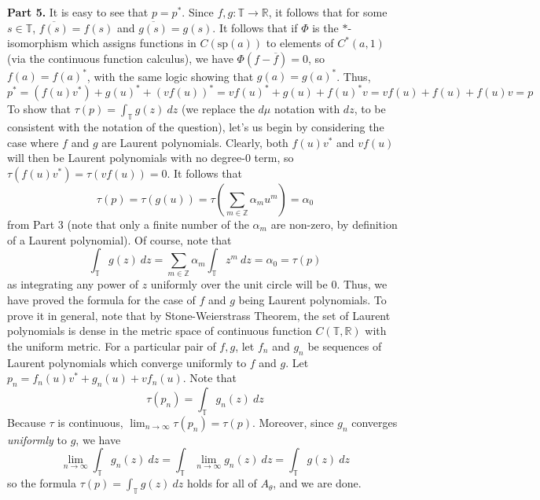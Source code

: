 \documentclass[aps,pra,showpacs,notitlepage,onecolumn,superscriptaddress,nofootinbib]{revtex4-1}
\theoremstyle{definition}
\begin{document}
    \noindent \textbf{Part 5.} It is easy to see that $p = p^{*}$. Since $f, g : \mathbb{T} \rightarrow \mathbb{R}$, it follows that for some $s \in \mathbb{T}$, $\overline{f(s)} = f(s)$ and $\overline{g(s)} = g(s)$.
    It follows that if $\Phi$ is the $*$-isomorphism which assigns functions in $C(\text{sp}(a))$ to elements of $C^{*}(a, 1)$ (via the continuous function calculus), we have $\Phi(f - \overline{f}) = 0$, so $f(a) = f(a)^{*}$, with the same logic showing that $g(a) = g(a)^{*}$.
    Thus,
    \begin{equation}
      p^{*} = (f(u) v^{*}) + g(u)^{*} + (v f(u))^{*} = v f(u)^{*} + g(u) + f(u)^{*} v = v f(u) + f(u) + f(u) v = p
    \end{equation}
    To show that $\tau(p) = \int_{\mathbb{T}} g(z) \ dz$ (we replace the $d\mu$ notation with $dz$, to be consistent with the notation of the question), let's us begin by considering the case where
    $f$ and $g$ are Laurent polynomials. Clearly, both $f(u) v^{*}$ and $v f(u)$ will then be Laurent polynomials with no degree-$0$ term, so $\tau(f(u) v^{*}) = \tau(v f(u)) = 0$. It follows that
    \begin{equation}
      \tau(p) = \tau(g(u)) = \tau \left( \displaystyle\sum_{m \in \mathbb{Z}} \alpha_m u^m \right) = \alpha_0
    \end{equation}
    from Part 3 (note that only a finite number of the $\alpha_m$ are non-zero, by definition of a Laurent polynomial). Of course, note that
    \begin{equation}
      \displaystyle\int_{\mathbb{T}} g(z) \ dz = \displaystyle\sum_{m \in \mathbb{Z}} \alpha_m \displaystyle\int_{\mathbb{T}} z^{m} \ dz = \alpha_0 = \tau(p)
    \end{equation}
    as integrating any power of $z$ uniformly over the unit circle will be $0$. Thus, we have proved the formula for the case of $f$ and $g$ being Laurent polynomials. To prove it in general, note that
    by Stone-Weierstrass Theorem, the set of Laurent polynomials is dense in the metric space of continuous function $C(\mathbb{T}, \mathbb{R})$ with the uniform metric. For a particular pair of $f, g$,
    let $f_n$ and $g_n$ be sequences of Laurent polynomials which converge uniformly to $f$ and $g$. Let $p_n = f_n(u) v^{*} + g_n(u) + v f_n(u)$. Note that
    \begin{equation}
      \tau(p_n) = \displaystyle\int_{\mathbb{T}} g_n(z) \ dz
    \end{equation}
    Because $\tau$ is continuous, $\lim_{n \to \infty} \tau(p_n) = \tau(p)$. Moreover, since $g_n$ converges \emph{uniformly} to $g$, we have
    $$\lim_{n \to \infty} \int_{\mathbb{T}} g_n(z) \ dz = \int_{\mathbb{T}} \lim_{n \to \infty} g_n(z) \ dz = \int_{\mathbb{T}} g(z) \ dz$$
    so the formula $\tau(p) = \int_{\mathbb{T}} g(z) \ dz$ holds for all of $A_{\theta}$, and we are done.
    \newline
\end{document}
